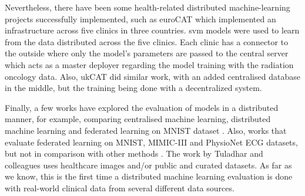 Nevertheless, there have been some health-related  distributed machine-learning projects successfully implemented, such as euroCAT  \cite{eurocat} which implemented an infrastructure across five clinics in three countries. \ac{svm} models were used to learn from the data distributed across the five clinics. Each clinic has a connector to the outside where only the model's parameters are passed to the central server which acts as a master deployer regarding the model training with the radiation oncology data.
Also, ukCAT \cite{ukcat} did similar work, with an added centralised database in the middle, but the training being done with a decentralized system.

Finally, a few works have explored the evaluation of models in a distributed manner, for example, comparing  centralised machine learning, distributed machine learning and federated learning on MNIST dataset \cite{performance_evaluation_1}. Also, works that evaluate federated learning on MNIST, MIMIC-III and PhysioNet ECG datasets, but not in comparison with other methods  \cite{performance_evaluation_2}. The work by Tuladhar and colleagues \cite{distributed} uses healthcare images and/or public and curated datasets.
As far as we know, this is the first time a distributed machine learning evaluation is done with real-world clinical data from several different data sources.